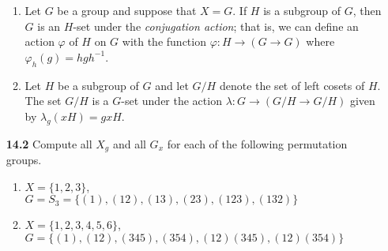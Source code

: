\documentclass[12pt,reqno]{amsart}
\newcommand{\<}{\ensuremath{\langle}}
\renewcommand{\>}{\ensuremath{\rangle}}
\begin{document}
\begin{enumerate}
\begin{enumerate}
 
\item
Let $G$ be a group and suppose that $X=G$. If $H$ is a subgroup of
$G$, then $G$ is an $H$-set under 
the \emph{conjugation action}; that is, we can define an action 
$\varphi$ of $H$ on $G$ with the function 
$\varphi: H \rightarrow (G \rightarrow G)$ where 
$\varphi_h(g) = hgh^{-1}$.
 
 
\item
Let $H$ be a subgroup of $G$ and let $G/H$ denote the set of left cosets
of $H$.  The set $G/H$ is a $G$-set under the action
$\lambda: G \rightarrow (G/H \rightarrow G/H)$ given by 
$\lambda_g(xH) = gxH$.%
 
\end{enumerate}

\item[{\bf 14.2}] \label{actions}
Compute all $X_g$ and all $G_x$ for each of the following permutation
groups. 
\begin{enumerate}
 
 \item
$X= \{1, 2, 3\}$, \\
$G=S_3=\{(1), (12), (13), (23), (123), (132)  \}$
 
 \item
$X = \{1, 2, 3, 4, 5, 6\}$, \\
$G = \{(1), (12), (345), (354), (12)(345), (12)(354)  \}$
 

\end{enumerate}
\end{enumerate}
\end{document}

